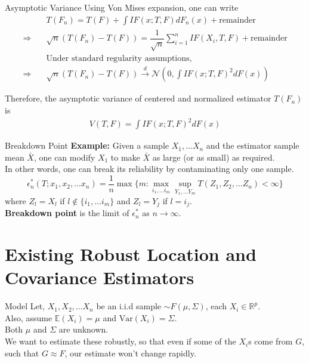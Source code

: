 \documentclass[10pt,xcolor=svgnames]{beamer} %
\newcommand{\R}{\mathbb{R}}
\newcommand{\E}{\mathbb{E}}
\newcommand{\var}{\text{Var}}
\begin{document}
\begin{frame}{Asymptotic Variance}
    Using Von Mises expansion, one can write
    \begin{align*}
        & T(F_n) = T(F) + \int IF(x; T, F) dF_n(x) + \text{remainder}\\
        \Rightarrow \quad & \sqrt{n}(T(F_n) - T(F)) = \dfrac{1}{\sqrt{n}} \sum_{i=1}^n IF(X_i, T, F) + \text{remainder}\\
        & \text{Under standard regularity assumptions,}\\
        \Rightarrow \quad & \sqrt{n}(T(F_n) - T(F)) \xrightarrow{d} \mathcal{N}\left( 0, \int IF(x; T, F)^2 dF(x) \right)
    \end{align*}
    
    \noindent Therefore, the asymptotic variance of centered and normalized estimator $T(F_n)$ is 
    \begin{align*}
        V(T, F) = \int IF(x; T, F)^2 dF(x)
    \end{align*}
\end{frame}

\begin{frame}{Breakdown Point}
    \textbf{Example:} Given a sample $X_1, \dots X_n$ and the estimator sample mean $\bar{X}$, one can modify $X_1$ to make $\bar{X}$ as large (or as small) as required.\\
    In other words, one can break its reliability by contaminating only one sample.\\
    \pause 
    \begin{equation*}
        \epsilon_n^\ast(T; x_1, x_2, \dots x_n) 
        = \dfrac{1}{n} \max\{ m : \max_{i_1, \dots i_m} \sup_{Y_{1}, \dots Y_{m}} T(Z_1, Z_2, \dots Z_n) < \infty \}
    \end{equation*}
    \noindent where $Z_l = X_l$ if $l \notin \{ i_1, \dots i_m \}$ and $Z_l = Y_j$ if $l = i_j$.\\
    
    \noindent \textbf{Breakdown point} is the limit of $\epsilon_n^\ast$ as $n \rightarrow \infty$.
\end{frame} 

\section{Existing Robust Location and Covariance Estimators}

\begin{frame}{Model}
    Let, $X_1, X_2, \dots X_n$ be an i.i.d sample $\sim F(\mu, \Sigma)$, each $X_i \in \R^p$.\\
    
    Also, assume $\E(X_i) = \mu$ and $\var(X_i) = \Sigma$.\\
    
    Both $\mu$ and $\Sigma$ are unknown.\\
    
    We want to estimate these robustly, so that even if some of the $X_i$s come from $G$, such that $G \approx F$, our estimate won't change rapidly.
\end{frame}
\end{document}
